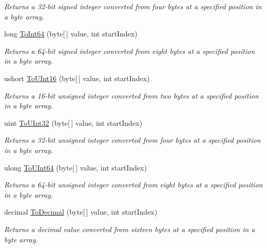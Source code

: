 \begin{DoxyCompactItemize}
\begin{DoxyCompactList}\small\item\em Returns a 32-\/bit signed integer converted from four bytes at a specified position in a byte array. \end{DoxyCompactList}\item 
long \mbox{\hyperlink{class_t_net_1_1_i_o_1_1_endian_bit_converter_aae5e69649f8d5240a1dd12bfc6da091c}{To\+Int64}} (byte\mbox{[}$\,$\mbox{]} value, int start\+Index)
\begin{DoxyCompactList}\small\item\em Returns a 64-\/bit signed integer converted from eight bytes at a specified position in a byte array. \end{DoxyCompactList}\item 
ushort \mbox{\hyperlink{class_t_net_1_1_i_o_1_1_endian_bit_converter_a164e8478c154756a2a902efd889d8c84}{To\+U\+Int16}} (byte\mbox{[}$\,$\mbox{]} value, int start\+Index)
\begin{DoxyCompactList}\small\item\em Returns a 16-\/bit unsigned integer converted from two bytes at a specified position in a byte array. \end{DoxyCompactList}\item 
uint \mbox{\hyperlink{class_t_net_1_1_i_o_1_1_endian_bit_converter_a663d4f8714c5a58433ecef1f7db68b99}{To\+U\+Int32}} (byte\mbox{[}$\,$\mbox{]} value, int start\+Index)
\begin{DoxyCompactList}\small\item\em Returns a 32-\/bit unsigned integer converted from four bytes at a specified position in a byte array. \end{DoxyCompactList}\item 
ulong \mbox{\hyperlink{class_t_net_1_1_i_o_1_1_endian_bit_converter_aa693b9f9c3b71a8bb02730f1cd00b42f}{To\+U\+Int64}} (byte\mbox{[}$\,$\mbox{]} value, int start\+Index)
\begin{DoxyCompactList}\small\item\em Returns a 64-\/bit unsigned integer converted from eight bytes at a specified position in a byte array. \end{DoxyCompactList}\item 
decimal \mbox{\hyperlink{class_t_net_1_1_i_o_1_1_endian_bit_converter_a226ca2d24192152238c46c2a47bc5c24}{To\+Decimal}} (byte\mbox{[}$\,$\mbox{]} value, int start\+Index)
\begin{DoxyCompactList}\small\item\em Returns a decimal value converted from sixteen bytes at a specified position in a byte array. \end{DoxyCompactList}\item 

\end{DoxyCompactItemize}
